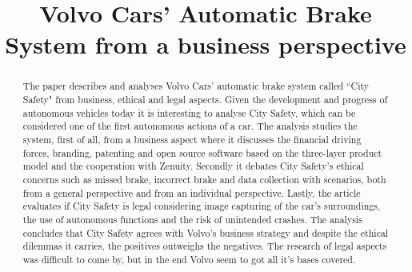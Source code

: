 \documentclass[conference]{IEEEtran}
\begin{document}
\title{Volvo Cars' Automatic Brake System from a business perspective}

\author{
\and
{}
}

\maketitle


\begin{abstract}
The paper describes and analyses Volvo Cars' automatic brake system called ``City Safety" from business, ethical and legal aspects. Given the development and progress of autonomous vehicles today it is interesting to analyse City Safety, which can be considered one of the first autonomous actions of a car. The analysis studies the system, first of all, from a business aspect where it discusses the financial driving forces, branding, patenting and open source software based on the three-layer product model and the cooperation with Zenuity. Secondly it debates City Safety's ethical concerns such as missed brake, incorrect brake and data collection with scenarios, both from a general perspective and from an individual perspective. Lastly, the article evaluates if City Safety is legal considering image capturing of the car's surroundings, the use of autonomous functions and the risk of unintended crashes. The analysis concludes that City Safety agrees with Volvo's business strategy and despite the ethical dilemmas it carries, the positives outweighs the negatives. The research of legal aspects was difficult to come by, but in the end Volvo seem to got all it's bases covered.
\end{abstract}

\end{document}

